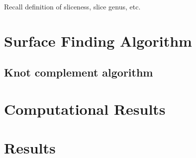\documentclass[11pt]{amsart}
\begin{document}
Recall definition of sliceness, slice genus, etc.

\section{Surface Finding Algorithm}

\subsection{Knot complement algorithm}

\section{Computational Results}

\section{Results}

\newpage

% 
% 
\end{document}
